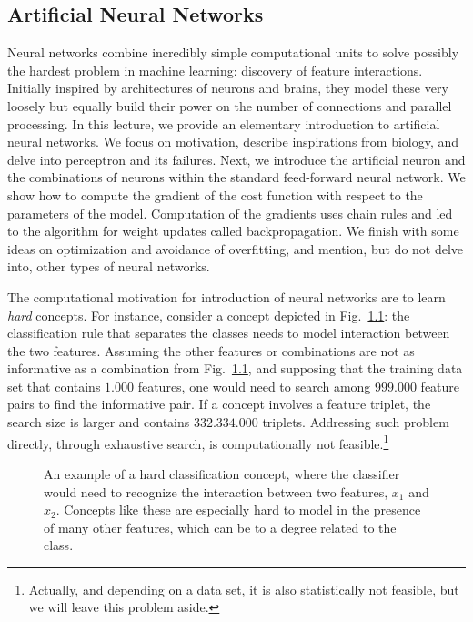 \begin{refsection}
\chapter{Artificial Neural Networks}

\begin{summary}
Neural networks combine incredibly simple computational units to solve possibly the hardest problem in machine learning: discovery of feature interactions. Initially inspired by architectures of neurons and brains, they model these very loosely but equally build their power on the number of connections and parallel processing. In this lecture, we provide an elementary introduction to artificial neural networks. We focus on motivation, describe inspirations from biology, and delve into perceptron and its failures. Next, we introduce the artificial neuron and the combinations of neurons within the standard feed-forward neural network. We show how to compute the gradient of the cost function with respect to the parameters of the model. Computation of the gradients uses chain rules and led to the algorithm for weight updates called backpropagation. We finish with some ideas on optimization and avoidance of overfitting, and mention, but do not delve into, other types of neural networks.
\end{summary}

The computational motivation for introduction of neural networks are to learn {\em hard} concepts. For instance, consider a concept depicted in Fig.~\ref{fig:hard-concept}: the classification rule that separates the classes needs to model interaction between the two features. Assuming the other features or combinations are not as informative as a combination from Fig.~\ref{fig:hard-concept}, and supposing that the training data set that contains $1.000$ features, one would need to search among $999.000$ feature pairs to find the informative pair. If a concept involves a feature triplet, the search size is larger and contains $332.334.000$ triplets. Addressing such problem directly, through exhaustive search, is computationally not feasible.\footnote{Actually, and depending on a data set, it is also statistically not feasible, but we will leave this problem aside.}

\begin{figure}
\caption{An example of a hard classification concept, where the classifier would need to recognize the interaction between two features, $x_1$ and $x_2$. Concepts like these are especially hard to model in the presence of many other features, which can be to a degree related to the class.}
\label{fig:hard-concept}
\end{figure}



\end{refsection}
